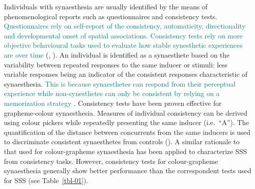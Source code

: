 \documentclass[
  man,
  floatsintext,
  longtable,
  a4paper,
  nolmodern,
  notxfonts,
  notimes,
  colorlinks=true,linkcolor=blue,citecolor=blue,urlcolor=blue]{apa7}
\begin{document}

Individuals with synaesthesia are usually identified by the means of
phenomenological reports such as questionnaires and consistency tests.
\textcolor{teal}{Questionnaires rely on self-report of the consistency, automaticity, directionality and developmental onset of spatial associations. Consistency tests rely on more objective behavioural tasks used to evaluate how stable synesthetic experiences are over time }(, ). An individual is
identified as a synaesthete based on the variability between repeated
responses to the same inducer or stimuli: less variable responses being
an indicator of the consistent responses characteristic of synaesthesia.
\textcolor{teal}{This is because synaesthetes can respond from their perceptual experience while non-synesthetes can only be consistent by relying on a memorization strategy}
.
Consistency tests have been proven effective for grapheme-colour
synaesthesia. Measures of individual consistency can be derived using
colour pickers while repeatedly presenting the same inducer
(i.e.~``A''). The quantification of the distance between concurrents
from the same inducers is used to discriminate consistent synaesthetes
from controls (). A
similar rationale to that used for colour-grapheme synaesthesia has been
applied to characterize SSS from consistency tasks. However, consistency
tests for colour-grapheme synaesthesia generally show better performance
than the correspondent tests used for SSS (see Table~\ref{tbl-01}).
\end{document}
